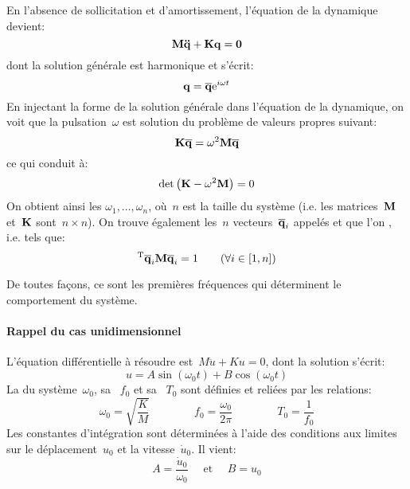 En l'absence de sollicitation et d'amortissement, l'équation de la dynamique devient:
\begin{equation} \MM{M}\VV{\ddot{q}}+\MM{K}\VV{q}=\VV{0} \end{equation}
dont la solution générale est harmonique et s'écrit:
\begin{equation} \VV{q}=\VV{\overline{q}}\mathrm{e}^{i\omega t} \end{equation}
En injectant la forme de la solution générale dans l'équation de la dynamique, on voit que la pulsation~$\omega$ est solution du problème de valeurs propres suivant:
\begin{equation} \MM{K}\VV{\overline{q}}=\omega^2\MM{M}\VV{\overline{q}} \end{equation}
ce qui conduit à:
\begin{equation} \det\left(\MM{K}-\omega^2\MM{M}\right)=0\end{equation}
\medskipvm
On obtient ainsi les 
$\omega_1,\ldots,\omega_n$, où~$n$ est la taille du système (i.e. les matrices~$\MM{M}$ et~$\MM{K}$ sont~$n\times n$).
\medskipvm
On trouve également les~$n$ vecteurs~$\VV{\overline{q}}_i$ appelés  et que l'on , i.e. tels que:
\begin{equation} \LL{\overline{q}}_i\MM{M}\VV{\overline{q}}_i=1 \qquad (\forall i\in[1,n]) \end{equation}
\medskipvm
{}

De toutes façons, ce sont les premières fréquences qui déterminent le comportement du système.

\medskip
{}
\paragraph{Rappel du cas unidimensionnel}
L'équation différentielle à résoudre est~$M\ddot{u}+Ku=0$, dont la solution s'écrit: \begin{equation} u=A\sin (\omega_0 t)+B\cos(\omega_0 t) \end{equation}
La  du système~$\omega_0$, sa ~$f_0$ et sa ~$T_0$ sont définies et reliées par les relations:
\begin{equation}
\omega_0=\sqrt{\dfrac{K}M} \qquad\qquad f_0=\dfrac{\omega_0}{2\pi} \qquad\qquad T_0=\dfrac1{f_0}
\end{equation}
Les constantes d'intégration sont déterminées à l'aide des conditions aux limites sur le déplacement~$u_0$ et la
vitesse~$\dot{u}_0$. Il vient: \begin{equation} A=\frac{\dot{u}_0}{\omega_0} \quad\text{ et }\quad B=u_0\end{equation}

